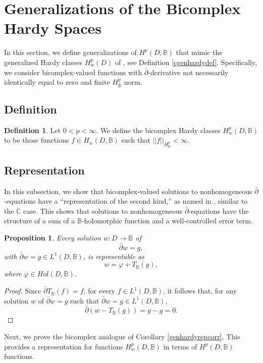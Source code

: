 \documentclass[suppldata]{interact}
\theoremstyle{plain}%
\newtheorem{prop}[theorem]{Proposition}
\theoremstyle{definition}
\newtheorem{deff}[theorem]{Definition}
\theoremstyle{remark}
\newcommand{\dbar}{\bar\partial}
\newcommand{\bc}{\mathbb{B}}
\newcommand{\holb}{Hol(D,\bc)}
\newcommand{\hw}{H_w(D, \bc)}
\newcommand{\hwp}{H^p_{w}(D,\bc)}
\begin{document}
\section{Generalizations of the Bicomplex Hardy Spaces}\label{generalizedbchardysection}

In this section, we define generalizations of $H^p(D,\bc)$ that mimic the generalized Hardy classes $H^p_w(D)$ of \cite{WB}, see Definition \ref{cgenhardydef}. Specifically, we consider bicomplex-valued functions with $\dbar$-derivative not necessarily identically equal to zero and finite $H^p_\bc$ norm. 

\subsection{Definition}

\begin{deff}
    Let $0 < p < \infty$. We define the bicomplex Hardy classes $\hwp$ to be those functions $f \in \hw$ such that $||f||_{H^p_{\bc}} < \infty$.
\end{deff}

\subsection{Representation}

In this subsection, we show that bicomplex-valued solutions to nonhomogeneous $\dbar$-equations have a ``representation of the second kind,'' as named in \cite{Vek, WB}, similar to the $\mathbb{C}$ case. This shows that solutions to nonhomogeneous $\dbar$-equations have the structure of a sum of a $\bc$-holomorphic function and a well-controlled error term.

\begin{prop}\label{genbcnonhomogrep}
    Every solution $w: D \to \bc$ of 
    \[
        \dbar w = g,
    \]
    with $\dbar w = g \in L^1(D, \bc)$, is representable as 
    \[
        w = \varphi + T_\bc(g),
    \]
    where $\varphi \in \holb$. 
\end{prop}

\begin{proof}
Since $\dbar T_\bc (f) = f$, for every $ f\in L^1(D, \bc)$, it follows that, for any solution $w$ of $\dbar w = g$ such that $\dbar w = g\in L^1(D, \bc)$,
\[
    \dbar (w - T_\bc(g)) = g - g = 0.
\]
\end{proof}

Next, we prove the bicomplex analogue of Corollary \ref{genhardyrepcorr}. This provides a representation for functions $H^p_w(D,\bc)$ in terms of $H^p(D,\bc)$ functions. 
\end{document}
